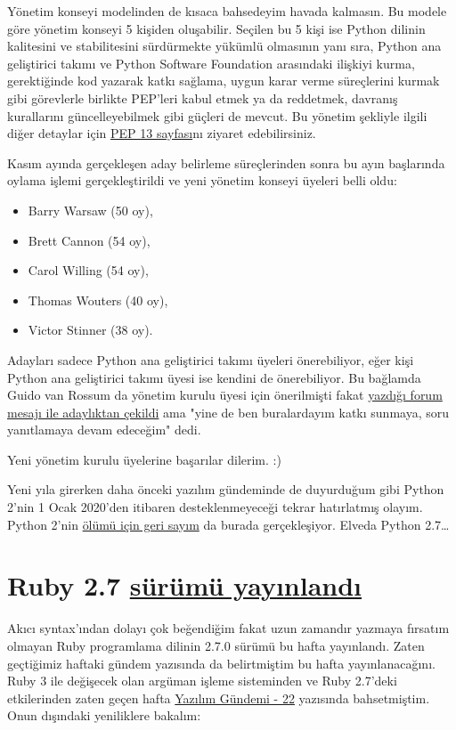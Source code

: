 \documentclass[11pt]{article}
\begin{document}
Yönetim konseyi modelinden de kısaca bahsedeyim havada kalmasın. Bu modele göre
yönetim konseyi 5 kişiden oluşabilir. Seçilen bu 5 kişi ise Python dilinin
kalitesini ve stabilitesini sürdürmekte yükümlü olmasının yanı sıra, Python ana
geliştirici takımı ve Python Software Foundation arasındaki ilişkiyi kurma,
gerektiğinde kod yazarak katkı sağlama, uygun karar verme süreçlerini kurmak
gibi görevlerle birlikte PEP'leri kabul etmek ya da reddetmek, davranış
kurallarını güncelleyebilmek gibi güçleri de mevcut. Bu yönetim şekliyle ilgili
diğer detaylar için \href{https://www.python.org/dev/peps/pep-0013/\#history}{PEP 13 sayfası}nı ziyaret edebilirsiniz.

Kasım ayında gerçekleşen aday belirleme süreçlerinden sonra bu ayın başlarında
oylama işlemi gerçekleştirildi ve yeni yönetim konseyi üyeleri belli oldu:
\begin{itemize}
\item Barry Warsaw (50 oy),
\item Brett Cannon (54 oy),
\item Carol Willing (54 oy),
\item Thomas Wouters (40 oy),
\item Victor Stinner (38 oy).
\end{itemize}

Adayları sadece Python ana geliştirici takımı üyeleri önerebiliyor, eğer kişi
Python ana geliştirici takımı üyesi ise kendini de önerebiliyor. Bu bağlamda
Guido van Rossum da yönetim kurulu üyesi için önerilmişti fakat \href{https://discuss.python.org/t/steering-council-nomination-guido-van-rossum-2020-term/2657/11}{yazdığı forum
mesajı ile adaylıktan çekildi} ama "yine de ben buralardayım katkı sunmaya, soru
yanıtlamaya devam edeceğim" dedi.

Yeni yönetim kurulu üyelerine başarılar dilerim. :)

Yeni yıla girerken daha önceki yazılım gündeminde de duyurduğum gibi Python
2'nin 1 Ocak 2020'den itibaren desteklenmeyeceği tekrar hatırlatmış olayım.
Python 2'nin \href{https://pythonclock.org/}{ölümü için geri sayım} da burada gerçekleşiyor. Elveda Python
2.7\ldots{}
\section{Ruby 2.7 \href{https://www.ruby-lang.org/en/news/2019/12/25/ruby-2-7-0-released/}{sürümü yayınlandı}}
\label{sec:orgc6eb2cb}
Akıcı syntax'ından dolayı çok beğendiğim fakat uzun zamandır yazmaya fırsatım
olmayan Ruby programlama dilinin 2.7.0 sürümü bu hafta yayınlandı. Zaten
geçtiğimiz haftaki gündem yazısında da belirtmiştim bu hafta yayınlanacağını.
Ruby 3 ile değişecek olan argüman işleme sisteminden ve Ruby 2.7'deki
etkilerinden zaten geçen hafta \href{../22/yazilim-gundemi-22.pdf}{Yazılım Gündemi - 22} yazısında bahsetmiştim.
Onun dışındaki yeniliklere bakalım:
\end{document}
